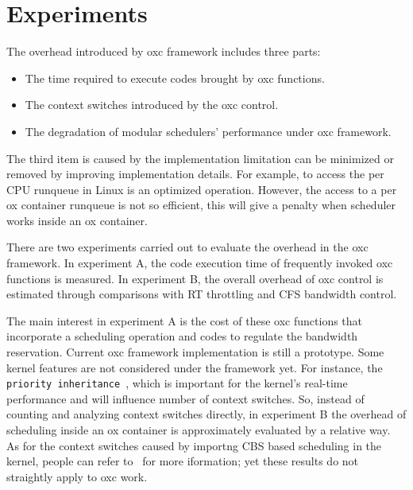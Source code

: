 \chapter{Experiments\label{chap:exp}}

The overhead introduced by oxc framework includes three parts:
\begin{itemize}
\item The time required to execute codes brought by oxc functions.
\item The context switches introduced by the oxc control.
\item The degradation of modular schedulers' performance under oxc 
	framework.
\end{itemize}
The third item is caused by the implementation limitation can be minimized 
or removed by improving implementation details. For example, to access 
the per CPU runqueue in Linux is an optimized operation. However, the 
access to a per ox container runqueue is not so efficient, this will 
give a penalty when scheduler works inside an ox container.

There are two experiments carried out to evaluate the overhead in the 
oxc framework. In experiment A, the code execution time of frequently 
invoked oxc functions is measured. In experiment B, the overall overhead 
of oxc control is estimated through comparisons with RT throttling and 
CFS bandwidth control.

The main interest in experiment A is the cost of these oxc functions
that incorporate a scheduling operation and codes to regulate the
bandwidth reservation. Current oxc framework implementation is still 
a prototype. Some kernel features are not considered under the 
framework yet. For instance, the 
\texttt{priority inheritance}~\cite{rt-mutex}, 
which is important for the kernel's 
real-time performance and will influence number of context switches. 
So, instead of counting and analyzing context switches directly,
in experiment B the overhead of scheduling inside an ox container is
approximately evaluated by a relative way. As for the context switches 
caused by importng CBS based scheduling in the kernel, people can refer  
to~\cite{Luigi09} for more iformation; yet these results do not straightly 
apply to oxc work. 

